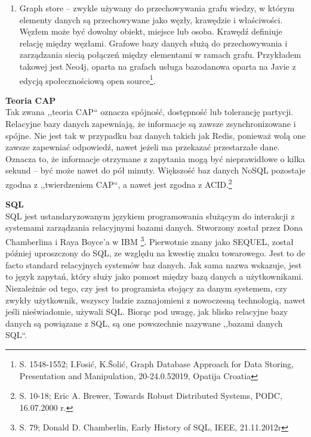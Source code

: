 \documentclass[12pt, a4paper, twoside, openany]{book}
\newcommand{\forceindent}{\leavevmode{\parindent=1.3em\indent}}
\begin{document}
\begin{enumerate}[label=--]
    Jest ona wykorzystywana w różnych przypadkach, takich jak serwisy społecznościowe i analiza danych w czasie rzeczywistym\footnote{S. 118-122; K. T. Sridhar, Modern Column Stores for Big Data Processing, XtremeData Technologies, Bangalore, India, 25.11.2017 r.}.
    \item Graph store -- zwykle używany do przechowywania grafu wiedzy, w którym elementy danych są przechowywane jako węzły, krawędzie i właściwości.
    Węzłem może być dowolny obiekt, miejsce lub osoba.
    Krawędź definiuje relację między węzłami.
    Grafowe bazy danych służą do przechowywania i zarządzania siecią połączeń między elementami w ramach grafu.
    Przykładem takowej jest Neo4j, oparta na grafach usługa bazodanowa oparta na Javie z edycją społecznościową open source\footnote{S. 1548-1552; I.Fosić, K.Šolić, Graph Database Approach for Data Storing, Presentation and Manipulation, 20-24.0.52019, Opatija Croatia}.
\end{enumerate}

\textbf{Teoria CAP} \\
\forceindent Tak zwana ,,teoria CAP`` oznacza spójność, dostępność lub tolerancję partycji. Relacyjne bazy danych zapewniają, że informacje są zawsze zsynchronizowane i spójne. Nie jest tak w przypadku baz danych takich jak Redis, ponieważ wolą one zawsze zapewniać odpowiedź, nawet jeżeli ma przekazać przestarzałe dane. Oznacza to, że informacje otrzymane z zapytania mogą być nieprawidłowe o kilka sekund -- być może nawet do pół minuty. Większość baz danych NoSQL pozostaje zgodna z ,,twierdzeniem CAP``, a nawet jest zgodna z ACID.\footnote{S. 10-18; Eric A. Brewer, Towards Robust Distributed Systems, PODC, 16.07.2000 r.}

\textbf{SQL\\}
\forceindent SQL jest ustandaryzowanym językiem programowania służącym do interakcji z systemami zarządzania relacyjnymi bazami danych. Stworzony został przez Dona Chamberlina i Raya Boyce'a w IBM \footnote{S. 79; Donald D. Chamberlin, Early History of SQL, IEEE, 21.11.2012r}.
Pierwotnie znany jako SEQUEL, został później uproszczony do SQL, ze względu na kwestię znaku towarowego.
Jest to de facto standard relacyjnych systemów baz danych.
Jak sama nazwa wskazuje, jest to język zapytań, który służy jako pomost między bazą danych a użytkownikami.
Niezależnie od tego, czy jest to programista stojący za danym systemem, czy zwykły użytkownik, wszyscy ludzie zaznajomieni z nowoczesną technologią, nawet jeśli nieświadomie, używali SQL.
Biorąc pod uwagę, jak blisko relacyjne bazy danych są powiązane z SQL, są one powszechnie nazywane ,,bazami danych SQL``.
\end{document}
